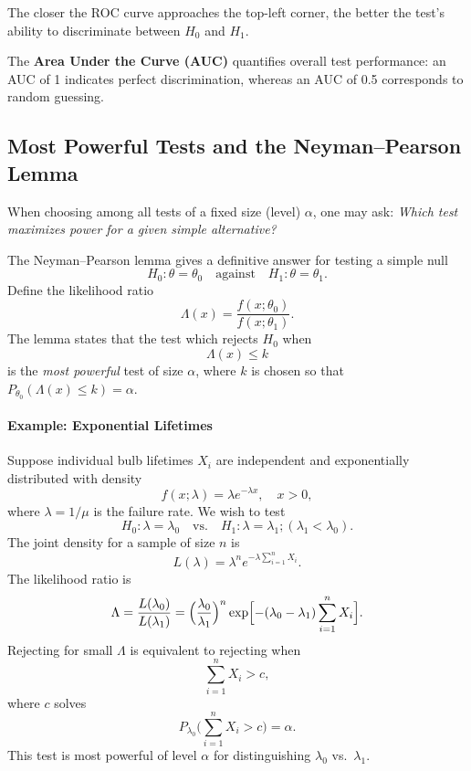 \documentclass[twoside]{book}
\begin{document}
The closer the ROC curve approaches the top-left corner, the better the test's ability to discriminate between \(H_0\) and \(H_1\).

\bigskip
The \textbf{Area Under the Curve (AUC)} quantifies overall test performance: an AUC of 1 indicates perfect discrimination, whereas an AUC of 0.5 corresponds to random guessing.


\subsection{Most Powerful Tests and the Neyman--Pearson Lemma}
When choosing among all tests of a fixed size (level) $\alpha$, one may ask: \emph{Which test maximizes power for a given simple alternative?}

The Neyman--Pearson lemma gives a definitive answer for testing a simple null
\begin{equation}
H_0: \theta=\theta_0
\quad\text{against}\quad
H_1: \theta=\theta_1.
\end{equation}
Define the likelihood ratio
\begin{equation}
\Lambda(x) = \frac{f(x;\theta_0)}{f(x;\theta_1)}.
\end{equation}
The lemma states that the test which rejects $H_0$ when
\begin{equation}
\Lambda(x) \le k
\end{equation}
is the \emph{most powerful} test of size $\alpha$, where $k$ is chosen so that $P_{\theta_0}(\Lambda(x)\le k)=\alpha$.

\paragraph{Example: Exponential Lifetimes}
Suppose individual bulb lifetimes $X_i$ are independent and exponentially distributed with density
\begin{equation}
f(x;\lambda)=\lambda e^{-\lambda x}, \quad x>0,
\end{equation}
where $\lambda=1/\mu$ is the failure rate. We wish to test
\begin{equation}
H_0: \lambda=\lambda_0 \quad\text{vs.}\quad H_1: \lambda=\lambda_1 ;(\lambda_1<\lambda_0).
\end{equation}
The joint density for a sample of size $n$ is
\begin{equation}
L(\lambda) = \lambda^n e^{-\lambda\sum_{i=1}^n X_i}.
\end{equation}
The likelihood ratio is
\begin{equation}
\Lambda = \frac{L(\lambda_0)}{L(\lambda_1)}
= \Bigl(\frac{\lambda_0}{\lambda_1}\Bigr)^n
\exp\Bigl[-(\lambda_0-\lambda_1)\sum_{i=1}^n X_i\Bigr].
\end{equation}
Rejecting for small $\Lambda$ is equivalent to rejecting when
\begin{equation}
\sum_{i=1}^n X_i > c,
\end{equation}
where $c$ solves
\begin{equation}
P_{\lambda_0}\bigl(\sum_{i=1}^n X_i>c\bigr)=\alpha.
\end{equation}
This test is most powerful of level $\alpha$ for distinguishing $\lambda_0$ vs.\ $\lambda_1$.
\end{document}
